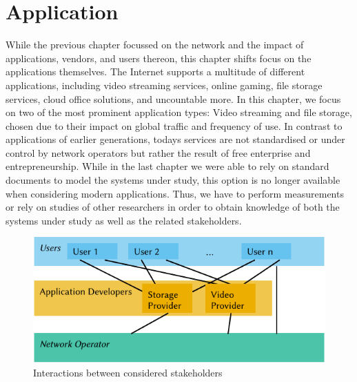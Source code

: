 \chapter{Application}\label{chap:application}

\newcommand{\download}{Download\xspace}
\newcommand{\live}{Live\xspace}
\newcommand{\serviceprovisioning}{Provisioning\xspace}
\newcommand{\streaming}{Streaming\xspace}

While the previous chapter focussed on the network and the impact of applications, vendors, and users thereon, this chapter shifts focus on the applications themselves.
The Internet supports a multitude of different applications, including video streaming services, online gaming, file storage services, cloud office solutions, and uncountable more.
In this chapter, we focus on two of the most prominent application types: Video streaming and file storage, chosen due to their impact on global traffic and frequency of use.
In contrast to applications of earlier generations, todays services are not standardised or under control by network operators but rather the result of free enterprise and entrepreneurship.
While in the last chapter we were able to rely on standard documents to model the systems under study, this option is no longer available when considering modern applications.
Thus, we have to perform measurements or rely on studies of other researchers in order to obtain knowledge of both the systems under study as well as the related stakeholders.


\begin{figure}
  \centering
  \includegraphics{application/figures/stakeholders}
  \caption{Interactions between considered stakeholders}
  \label{fig:application:stakeholders}
\end{figure}


